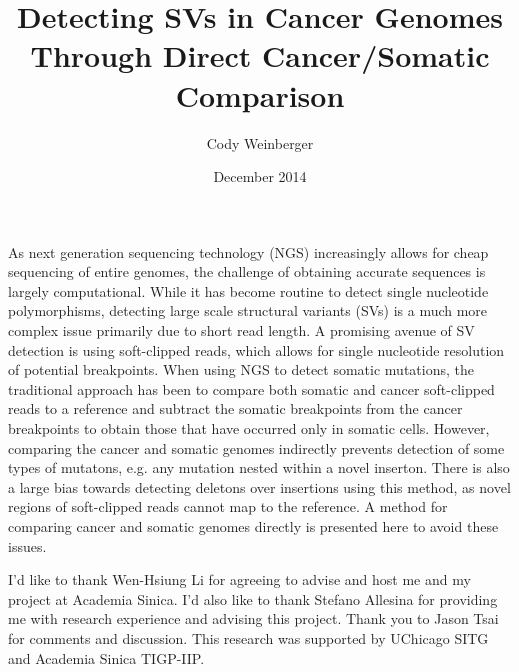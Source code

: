 \documentclass{easychithesis}
\begin{document}
\title{Detecting SVs in Cancer Genomes Through Direct Cancer/Somatic Comparison} 
\author{Cody Weinberger}
\date{December 2014}
\maketitle




As next generation sequencing technology (NGS) increasingly allows for cheap sequencing of entire genomes, the challenge of obtaining accurate sequences is largely computational. While it has become routine to detect single nucleotide polymorphisms, detecting large scale structural variants (SVs) is a much more complex issue primarily due to short read length. A promising avenue of SV detection is using soft-clipped reads, which allows for single nucleotide resolution of potential breakpoints. When using NGS to detect somatic mutations, the traditional approach has been to compare both somatic and cancer soft-clipped reads to a reference and subtract the somatic breakpoints from the cancer breakpoints to obtain those that have occurred only in somatic cells. However, comparing the cancer and somatic genomes indirectly prevents detection of some types of mutatons, e.g. any mutation nested within a novel inserton. There is also a large bias towards detecting deletons over insertions using this method, as novel regions of soft-clipped reads cannot map to the reference. A method for comparing cancer and somatic genomes directly is presented here to avoid these issues.

I'd like to thank Wen-Hsiung Li for agreeing to advise and host me and my project at Academia Sinica. I'd also like to thank Stefano Allesina for providing me with research experience and advising this project. Thank you to Jason Tsai for comments and discussion. This research was supported by UChicago SITG and Academia Sinica TIGP-IIP.
\end{document}

